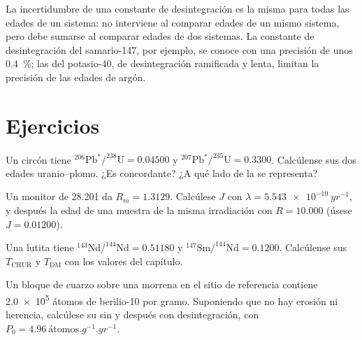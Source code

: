 La incertidumbre de una constante de desintegración es la misma para todas las edades de un sistema:
no interviene al comparar edades de un mismo sistema, pero debe sumarse
al comparar edades de dos sistemas. La constante de desintegración del samario-147, por
ejemplo, se conoce con una precisión de unos \qty{0.4}{\percent}; las del potasio-40,
de desintegración ramificada y lenta, limitan la precisión de las edades de argón.


\section{Ejercicios}

\begin{exercise}[$\star$]\label{exo:b3:advanced-geochronology:1}
Un circón tiene $^{206}\mathrm{Pb}^*/^{238}\mathrm{U} = 0.04500$ y
$^{207}\mathrm{Pb}^*/^{235}\mathrm{U} = 0.3300$. Calcúlense sus dos
edades uranio--plomo. ¿Es concordante? ¿A qué lado de la  se
representa?
\end{exercise}

\begin{exercise}[$\star$]\label{exo:b3:advanced-geochronology:2}
Un monitor de \qty{28.201}{\Ma} da $R_m = 1.3129$. Calcúlese $J$ con $\lambda
= \qty{5.543e-10}{yr^{-1}}$, y después la edad de una muestra de la misma irradiación
con $R = 10.000$ (úsese $J = 0.01200$).
\end{exercise}

\begin{exercise}[$\star$]\label{exo:b3:advanced-geochronology:3}
Una lutita tiene $^{143}\mathrm{Nd}/^{144}\mathrm{Nd} = 0.51180$ y
$^{147}\mathrm{Sm}/^{144}\mathrm{Nd} = 0.1200$. Calcúlense sus $T_{\mathrm{CHUR}}$
y $T_{\mathrm{DM}}$ con los valores del capítulo.
\end{exercise}

\begin{exercise}[$\star$]\label{exo:b3:advanced-geochronology:4}
Un bloque de cuarzo sobre una morrena en el sitio de referencia contiene \num{2.0e5}
átomos de berilio-10 por gramo. Suponiendo que no hay erosión ni herencia,
calcúlese su  sin y después con desintegración, con $P_0 =
\qty{4.96}{\text{átomos}.g^{-1}.yr^{-1}}$.
\end{exercise}

